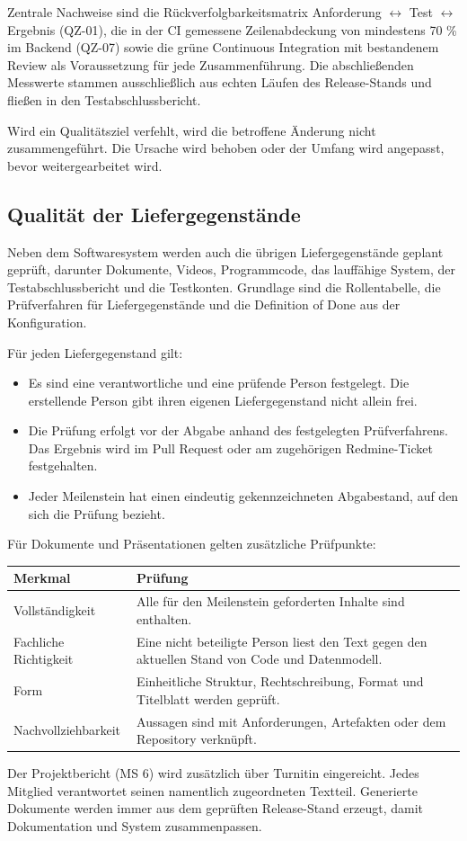 \documentclass[11pt,a4paper]{article}
\begin{document}
Zentrale Nachweise sind die Rückverfolgbarkeitsmatrix Anforderung $\leftrightarrow$ Test $\leftrightarrow$ Ergebnis (QZ-01), die in der CI gemessene Zeilenabdeckung von mindestens 70 \% im Backend (QZ-07) sowie die grüne Continuous Integration mit bestandenem Review als Voraussetzung für jede Zusammenführung. Die abschließenden Messwerte stammen ausschließlich aus echten Läufen des Release-Stands und fließen in den Testabschlussbericht.

Wird ein Qualitätsziel verfehlt, wird die betroffene Änderung nicht zusammengeführt. Die Ursache wird behoben oder der Umfang wird angepasst, bevor weitergearbeitet wird.

\subsection{Qualität der Liefergegenstände}

Neben dem Softwaresystem werden auch die übrigen Liefergegenstände geplant geprüft, darunter Dokumente, Videos, Programmcode, das lauffähige System, der Testabschlussbericht und die Testkonten. Grundlage sind die Rollentabelle, die Prüfverfahren für Liefergegenstände und die Definition of Done aus der Konfiguration.

Für jeden Liefergegenstand gilt:

\begin{itemize}
\item Es sind eine verantwortliche und eine prüfende Person festgelegt. Die erstellende Person gibt ihren eigenen Liefergegenstand nicht allein frei.
\item Die Prüfung erfolgt vor der Abgabe anhand des festgelegten Prüfverfahrens. Das Ergebnis wird im Pull Request oder am zugehörigen Redmine-Ticket festgehalten.
\item Jeder Meilenstein hat einen eindeutig gekennzeichneten Abgabestand, auf den sich die Prüfung bezieht.
\end{itemize}


Für Dokumente und Präsentationen gelten zusätzliche Prüfpunkte:

\begin{tabularx}{\linewidth}{@{}>{\hsize=0.63\hsize\RaggedRight\arraybackslash}X >{\hsize=1.37\hsize\RaggedRight\arraybackslash}X@{}}
\toprule
\textbf{Merkmal} & \textbf{Prüfung} \\
\midrule
\endhead
Vollständigkeit & Alle für den Meilenstein geforderten Inhalte sind enthalten. \\
Fachliche Richtigkeit & Eine nicht beteiligte Person liest den Text gegen den aktuellen Stand von Code und Datenmodell. \\
Form & Einheitliche Struktur, Rechtschreibung, Format und Titelblatt werden geprüft. \\
Nachvollziehbarkeit & Aussagen sind mit Anforderungen, Artefakten oder dem Repository verknüpft. \\
\bottomrule
\end{tabularx}

Der Projektbericht (MS 6) wird zusätzlich über Turnitin eingereicht. Jedes Mitglied verantwortet seinen namentlich zugeordneten Textteil. Generierte Dokumente werden immer aus dem geprüften Release-Stand erzeugt, damit Dokumentation und System zusammenpassen.
\end{document}
